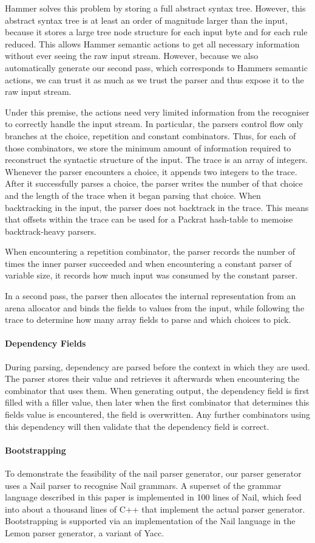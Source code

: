 Hammer solves this problem by storing a full abstract syntax tree. However, this
abstract syntax tree is at least an order of magnitude larger than the input,
because it stores a large tree node structure for each input byte and for each
rule reduced. This allows Hammer semantic actions to get all necessary
information without ever seeing the raw input stream. However, because we also
automatically generate our second pass, which corresponds to Hammers semantic
actions, we can trust it as much as we trust the parser and thus expose it to
the raw input stream.

Under this premise, the actions need very limited information from the
recogniser to correctly handle the input stream. In particular, the parsers
control flow only branches at the choice, repetition and constant
combinators.
Thus, for each of those combinators, we store the minimum amount of information
required to reconstruct the syntactic structure of the input. The trace is an
array of integers.
 Whenever the parser encounters a choice, it appends two integers to the trace. After it
successfully parses a choice, the parser writes the number of that choice and
the length of the trace when it began parsing that choice. When backtracking in
the input, the parser does not backtrack in the trace. This means that offsets
within the trace can be used for a Packrat hash-table to memoise backtrack-heavy
parsers.

When encountering a repetition combinator, the parser records the number of
times the inner parser succeeded and when encountering a constant parser of
variable size, it records how much input was consumed by the constant parser. 

In a second pass, the parser then allocates the internal representation from an
arena allocator and binds the fields to values from the input, while following
the trace to determine how many array fields to parse and which choices to pick.
\paragraph{Dependency Fields}
During parsing, dependency are parsed  before the context in which they are
used. The parser stores their value and retrieves it afterwards when
encountering the combinator that uses them. When generating output, the
dependency field is first filled with a filler value, then later when the first
combinator that determines this fields value is encountered, the field is
overwritten. Any further combinators using this dependency will then validate
that the dependency field is correct.
\paragraph{Bootstrapping}
To demonstrate the feasibility of the nail parser generator, our parser
generator uses a Nail parser to recognise Nail grammars. A superset of the
grammar language described in this paper is implemented in 100 lines of Nail,
which feed into about a thousand lines of C++ that implement the actual parser
generator. Bootstrapping is supported via an implementation of the Nail language
in the Lemon parser generator, a variant of Yacc.
